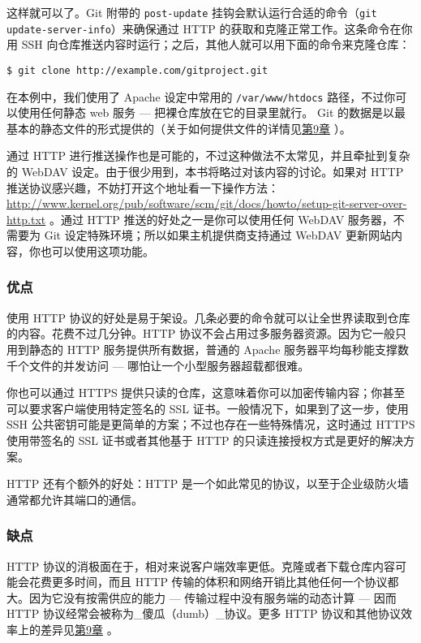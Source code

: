 \documentclass[a4paper]{book}
\newcommand{\prechap}{第}
\newcommand{\postchap}{章}
\newcommand{\chapref}[1]{\hyperref[chap:#1]{\prechap #1\postchap}}
\begin{document}
这样就可以了。Git 附带的 \texttt{post-update} 挂钩会默认运行合适的命令（\texttt{git update-server-info}）来确保通过 HTTP 的获取和克隆正常工作。这条命令在你用 SSH 向仓库推送内容时运行；之后，其他人就可以用下面的命令来克隆仓库：

\begin{shaded}\begin{verbatim}
$ git clone http://example.com/gitproject.git
\end{verbatim}\end{shaded}

在本例中，我们使用了 Apache 设定中常用的 \texttt{/var/www/htdocs} 路径，不过你可以使用任何静态 web 服务 --- 把裸仓库放在它的目录里就行。 Git 的数据是以最基本的静态文件的形式提供的（关于如何提供文件的详情见\chapref{9} ）。

通过 HTTP 进行推送操作也是可能的，不过这种做法不太常见，并且牵扯到复杂的 WebDAV 设定。由于很少用到，本书将略过对该内容的讨论。如果对 HTTP 推送协议感兴趣，不妨打开这个地址看一下操作方法：\url{http://www.kernel.org/pub/software/scm/git/docs/howto/setup-git-server-over-http.txt} 。通过 HTTP 推送的好处之一是你可以使用任何 WebDAV 服务器，不需要为 Git 设定特殊环境；所以如果主机提供商支持通过 WebDAV 更新网站内容，你也可以使用这项功能。

\subsubsection{优点}

使用 HTTP 协议的好处是易于架设。几条必要的命令就可以让全世界读取到仓库的内容。花费不过几分钟。HTTP 协议不会占用过多服务器资源。因为它一般只用到静态的 HTTP 服务提供所有数据，普通的 Apache 服务器平均每秒能支撑数千个文件的并发访问 --- 哪怕让一个小型服务器超载都很难。

你也可以通过 HTTPS 提供只读的仓库，这意味着你可以加密传输内容；你甚至可以要求客户端使用特定签名的 SSL 证书。一般情况下，如果到了这一步，使用 SSH 公共密钥可能是更简单的方案；不过也存在一些特殊情况，这时通过 HTTPS 使用带签名的 SSL 证书或者其他基于 HTTP 的只读连接授权方式是更好的解决方案。

HTTP 还有个额外的好处：HTTP 是一个如此常见的协议，以至于企业级防火墙通常都允许其端口的通信。

\subsubsection{缺点}

HTTP 协议的消极面在于，相对来说客户端效率更低。克隆或者下载仓库内容可能会花费更多时间，而且 HTTP 传输的体积和网络开销比其他任何一个协议都大。因为它没有按需供应的能力 --- 传输过程中没有服务端的动态计算 --- 因而 HTTP 协议经常会被称为\_傻瓜（dumb）\_协议。更多 HTTP 协议和其他协议效率上的差异见\chapref{9} 。
\end{document}
